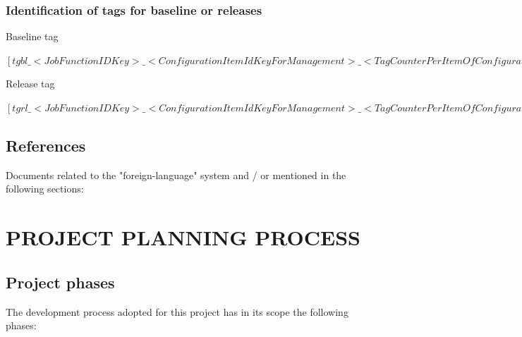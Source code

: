 \documentclass[11pt, twoside, a4paper]{book}
\begin{document}
                \subsection{Identification of tags for baseline or releases}

					\begin{center}
						Baseline tag													

            			$[tgbl\_<Job Function ID Key>\_<Configuration Item Id Key For Management>\_<Tag Counter Per Item Of Configuration>]$
					\end{center}					                			

        			\begin{center}
		   				Release tag					        			
        			
            			$[tgrl\_<Job Function ID Key>\_<Configuration Item Id Key For Management>\_<Tag Counter Per Item Of Configuration>]$	
					\end{center}					                
					
            \section{References}
                    
                    Documents related to the "foreign-language" system and / or mentioned in the following sections:

            
        \chapter{PROJECT PLANNING PROCESS}
                	
			\section{Project phases}
			
				The development process adopted for this project has in its scope the following phases:
				
\end{document}
